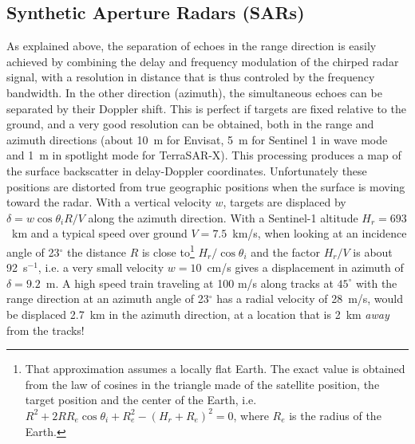  \subsection{Synthetic Aperture Radars (SARs)}
As  explained above, the separation of echoes in the range direction is easily achieved by combining the delay and frequency modulation of 
the chirped radar signal, with a resolution in distance that is thus controled by the frequency bandwidth. 
In the other direction (azimuth), the simultaneous echoes can be separated by their Doppler shift. 
This is perfect if targets are fixed relative to the ground, and a 
very good resolution can be obtained, both in the range and azimuth directions (about 10~m for Envisat, 5~m for Sentinel 1 in wave mode and 1~m in spotlight mode for TerraSAR-X). This processing 
produces a  map of the surface 
backscatter in delay-Doppler coordinates. Unfortunately these positions are distorted from  true geographic positions when the surface is moving toward the 
radar. With a vertical velocity $w$, targets are displaced by $\delta=w \cos \theta_i  R/V$ along the azimuth direction. With a Sentinel-1 altitude $H_r = 693$~km  and a typical speed over ground $V=7.5$~km/s, when looking at an incidence angle of 23$^\circ$ the distance $R$ is close to\footnote{That approximation assumes a locally flat Earth. The exact value is obtained from the law of cosines in the triangle made of the satellite position, the target position and the center of the Earth, i.e. $R^2 + 2 R R_e \cos \theta_i +R_e^2 - (H_r +R_e)^2=0$, where $R_e$ is the radius of the Earth.} $H_r/\cos \theta_i$ and the 
factor $H_r/V$ is about 92~s$^{-1}$, i.e. a very small velocity  $w= 10$~cm/s gives a displacement in azimuth of $\delta=9.2$~m. 
A high speed train traveling at 100 m/s along tracks at $45^\circ$ with the range direction at an azimuth angle of 23$^\circ$ has a radial velocity of 28~m/s, would be displaced 2.7~km in the azimuth direction, at a location that is 2~km \textit{away} from the tracks!
%
%


